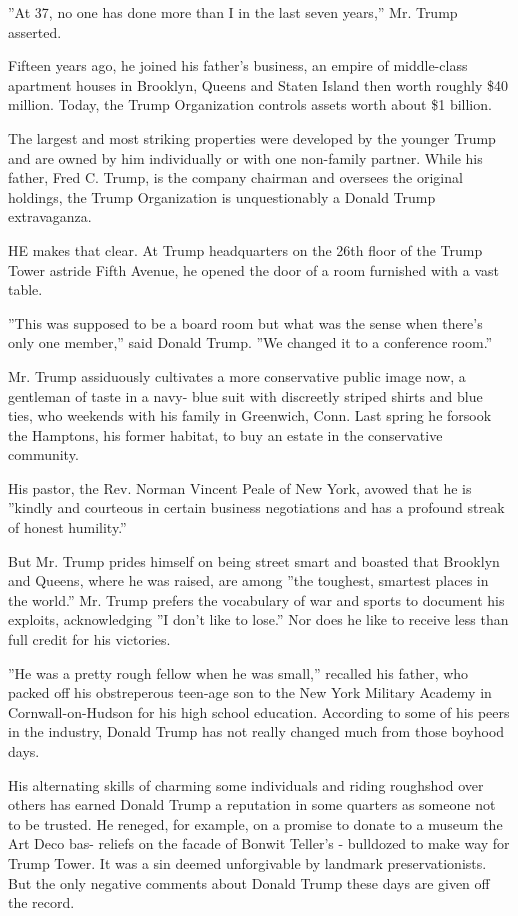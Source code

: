 ''At 37, no one has done more than I in the last seven years,'' Mr.
Trump asserted.

Fifteen years ago, he joined his father's business, an empire of
middle-class apartment houses in Brooklyn, Queens and Staten Island then
worth roughly \$40 million. Today, the Trump Organization controls
assets worth about \$1 billion.

The largest and most striking properties were developed by the younger
Trump and are owned by him individually or with one non-family partner.
While his father, Fred C. Trump, is the company chairman and oversees
the original holdings, the Trump Organization is unquestionably a Donald
Trump extravaganza.

HE makes that clear. At Trump headquarters on the 26th floor of the
Trump Tower astride Fifth Avenue, he opened the door of a room furnished
with a vast table.

''This was supposed to be a board room but what was the sense when
there's only one member,'' said Donald Trump. ''We changed it to a
conference room.''

Mr. Trump assiduously cultivates a more conservative public image now, a
gentleman of taste in a navy- blue suit with discreetly striped shirts
and blue ties, who weekends with his family in Greenwich, Conn. Last
spring he forsook the Hamptons, his former habitat, to buy an estate in
the conservative community.

His pastor, the Rev. Norman Vincent Peale of New York, avowed that he is
''kindly and courteous in certain business negotiations and has a
profound streak of honest humility.''

But Mr. Trump prides himself on being street smart and boasted that
Brooklyn and Queens, where he was raised, are among ''the toughest,
smartest places in the world.'' Mr. Trump prefers the vocabulary of war
and sports to document his exploits, acknowledging ''I don't like to
lose.'' Nor does he like to receive less than full credit for his
victories.

''He was a pretty rough fellow when he was small,'' recalled his father,
who packed off his obstreperous teen-age son to the New York Military
Academy in Cornwall-on-Hudson for his high school education. According
to some of his peers in the industry, Donald Trump has not really
changed much from those boyhood days.

His alternating skills of charming some individuals and riding roughshod
over others has earned Donald Trump a reputation in some quarters as
someone not to be trusted. He reneged, for example, on a promise to
donate to a museum the Art Deco bas- reliefs on the facade of Bonwit
Teller's - bulldozed to make way for Trump Tower. It was a sin deemed
unforgivable by landmark preservationists. But the only negative
comments about Donald Trump these days are given off the record.

